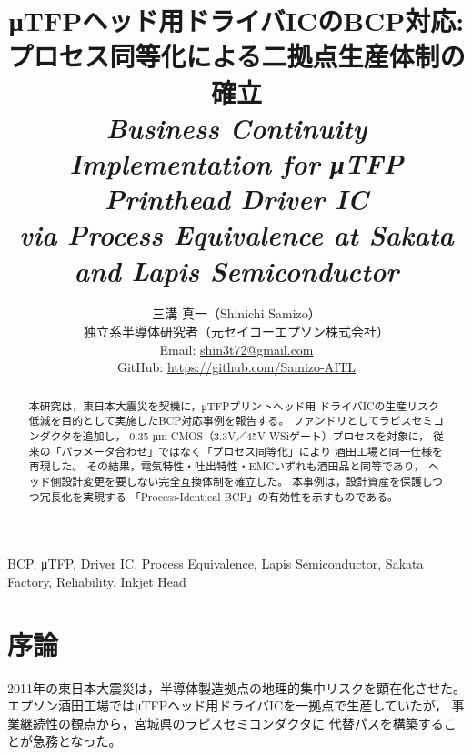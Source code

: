 \documentclass[conference]{IEEEtran}
\begin{document}
\title{%
μTFPヘッド用ドライバICのBCP対応:\\
プロセス同等化による二拠点生産体制の確立\\[2mm]
\textit{Business Continuity Implementation for μTFP Printhead Driver IC\\
via Process Equivalence at Sakata and Lapis Semiconductor}
}

\author{%
三溝 真一（Shinichi Samizo）\\
独立系半導体研究者（元セイコーエプソン株式会社）\\
Email: \href{mailto:shin3t72@gmail.com}{shin3t72@gmail.com} \\
GitHub: \url{https://github.com/Samizo-AITL}
}

\maketitle

\begin{abstract}
本研究は，東日本大震災を契機に，μTFPプリントヘッド用
ドライバICの生産リスク低減を目的として実施したBCP対応事例を報告する。
ファンドリとしてラピスセミコンダクタを追加し，
0.35 µm CMOS（3.3V／45V WSiゲート）プロセスを対象に，
従来の「パラメータ合わせ」ではなく「プロセス同等化」により
酒田工場と同一仕様を再現した。
その結果，電気特性・吐出特性・EMCいずれも酒田品と同等であり，
ヘッド側設計変更を要しない完全互換体制を確立した。
本事例は，設計資産を保護しつつ冗長化を実現する
「Process-Identical BCP」の有効性を示すものである。
\end{abstract}

\begin{IEEEkeywords}
BCP, μTFP, Driver IC, Process Equivalence, Lapis Semiconductor, Sakata Factory, Reliability, Inkjet Head
\end{IEEEkeywords}

\section{序論}
2011年の東日本大震災は，半導体製造拠点の地理的集中リスクを顕在化させた。
エプソン酒田工場ではμTFPヘッド用ドライバICを一拠点で生産していたが，
事業継続性の観点から，宮城県のラピスセミコンダクタに
代替パスを構築することが急務となった。
\end{document}
